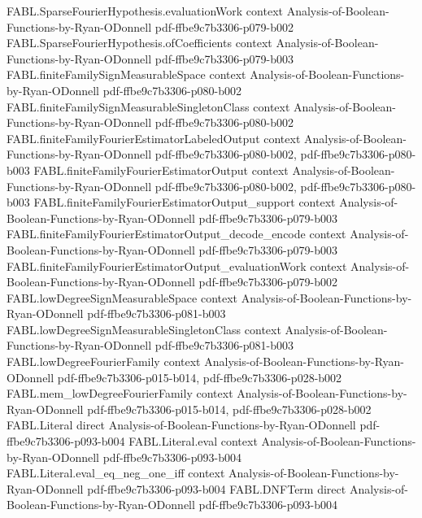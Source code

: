 \begin{theorem}
\proofstep
  {FABL.SparseFourierHypothesis.evaluationWork}
  {context}
  {Analysis-of-Boolean-Functions-by-Ryan-ODonnell}
  {pdf-ffbe9c7b3306-p079-b002}
\proofstep
  {FABL.SparseFourierHypothesis.ofCoefficients}
  {context}
  {Analysis-of-Boolean-Functions-by-Ryan-ODonnell}
  {pdf-ffbe9c7b3306-p079-b003}
\proofstep
  {FABL.finiteFamilySignMeasurableSpace}
  {context}
  {Analysis-of-Boolean-Functions-by-Ryan-ODonnell}
  {pdf-ffbe9c7b3306-p080-b002}
\proofstep
  {FABL.finiteFamilySignMeasurableSingletonClass}
  {context}
  {Analysis-of-Boolean-Functions-by-Ryan-ODonnell}
  {pdf-ffbe9c7b3306-p080-b002}
\proofstep
  {FABL.finiteFamilyFourierEstimatorLabeledOutput}
  {context}
  {Analysis-of-Boolean-Functions-by-Ryan-ODonnell}
  {pdf-ffbe9c7b3306-p080-b002,
    pdf-ffbe9c7b3306-p080-b003}
\proofstep
  {FABL.finiteFamilyFourierEstimatorOutput}
  {context}
  {Analysis-of-Boolean-Functions-by-Ryan-ODonnell}
  {pdf-ffbe9c7b3306-p080-b002,
    pdf-ffbe9c7b3306-p080-b003}
\proofstep
  {FABL.finiteFamilyFourierEstimatorOutput_support}
  {context}
  {Analysis-of-Boolean-Functions-by-Ryan-ODonnell}
  {pdf-ffbe9c7b3306-p079-b003}
\proofstep
  {FABL.finiteFamilyFourierEstimatorOutput_decode_encode}
  {context}
  {Analysis-of-Boolean-Functions-by-Ryan-ODonnell}
  {pdf-ffbe9c7b3306-p079-b003}
\proofstep
  {FABL.finiteFamilyFourierEstimatorOutput_evaluationWork}
  {context}
  {Analysis-of-Boolean-Functions-by-Ryan-ODonnell}
  {pdf-ffbe9c7b3306-p079-b002}
\proofstep
  {FABL.lowDegreeSignMeasurableSpace}
  {context}
  {Analysis-of-Boolean-Functions-by-Ryan-ODonnell}
  {pdf-ffbe9c7b3306-p081-b003}
\proofstep
  {FABL.lowDegreeSignMeasurableSingletonClass}
  {context}
  {Analysis-of-Boolean-Functions-by-Ryan-ODonnell}
  {pdf-ffbe9c7b3306-p081-b003}
\proofstep
  {FABL.lowDegreeFourierFamily}
  {context}
  {Analysis-of-Boolean-Functions-by-Ryan-ODonnell}
  {pdf-ffbe9c7b3306-p015-b014,
    pdf-ffbe9c7b3306-p028-b002}
\proofstep
  {FABL.mem_lowDegreeFourierFamily}
  {context}
  {Analysis-of-Boolean-Functions-by-Ryan-ODonnell}
  {pdf-ffbe9c7b3306-p015-b014,
    pdf-ffbe9c7b3306-p028-b002}
\proofstep
  {FABL.Literal}
  {direct}
  {Analysis-of-Boolean-Functions-by-Ryan-ODonnell}
  {pdf-ffbe9c7b3306-p093-b004}
\proofstep
  {FABL.Literal.eval}
  {context}
  {Analysis-of-Boolean-Functions-by-Ryan-ODonnell}
  {pdf-ffbe9c7b3306-p093-b004}
\proofstep
  {FABL.Literal.eval_eq_neg_one_iff}
  {context}
  {Analysis-of-Boolean-Functions-by-Ryan-ODonnell}
  {pdf-ffbe9c7b3306-p093-b004}
\proofstep
  {FABL.DNFTerm}
  {direct}
  {Analysis-of-Boolean-Functions-by-Ryan-ODonnell}
  {pdf-ffbe9c7b3306-p093-b004}

\end{theorem}
